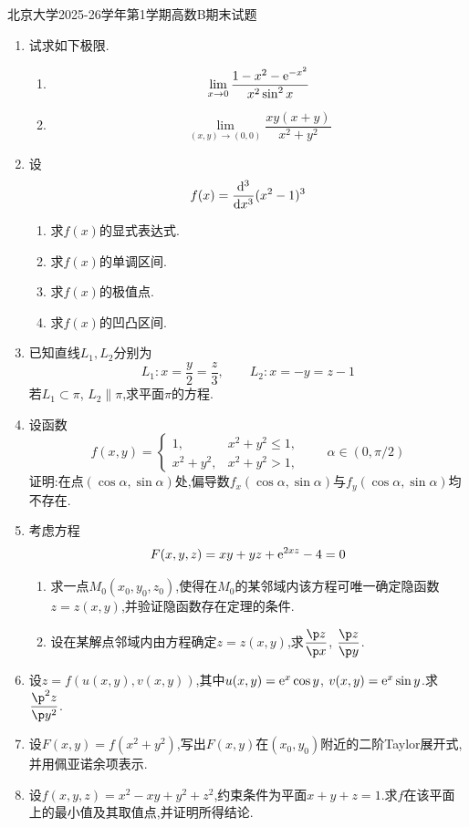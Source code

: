 \documentclass{ctexart}
\begin{document}
\pagestyle{empty}
\begin{center}\Large
北京大学2025-26学年第1学期高数B期末试题
\end{center}

\begin{enumerate}[leftmargin=*,label=\textbf{\arabic*.},topsep=0pt,parsep=0pt,itemsep=0pt,partopsep=0pt]
    \item 试求如下极限.
\begin{enumerate}[label=\tbf{(\alph*)},leftmargin=*,topsep=0pt,parsep=0pt,itemsep=0pt,partopsep=0pt]
\item \[\lim_{x\to0}\dfrac{1-x^2-\mathrm{e}^{-x^2}}{x^2\sin^2x}\]
\item \[\lim_{(x,y)\to(0,0)}\dfrac{xy(x+y)}{x^2+y^2}\]
\end{enumerate}
    \item 设
\[f(x)=\dfrac{\mathrm{d}^3}{\mathrm{d} x^3}(x^2-1)^3\]
\begin{enumerate}[label=\tbf{(\alph*)},leftmargin=*,topsep=0pt,parsep=0pt,itemsep=0pt,partopsep=0pt]
\item 求$f(x)$的显式表达式.
\item 求$f(x)$的单调区间.
\item 求$f(x)$的极值点.
\item 求$f(x)$的凹凸区间.
\end{enumerate}
    \item 已知直线$L_1,L_2$分别为
\[L_1:x=\dfrac y2=\dfrac z3,\qquad L_2:x=-y=z-1\]
若$L_1\subset\pi$, $L_2\parallel\pi$,求平面$\pi$的方程.
    \item 设函数
\[f(x,y)=\begin{cases}1,&x^2+y^2\leqslant1,\\x^2+y^2,&x^2+y^2>1,\end{cases}\qquad \alpha\in(0,\pi/2)\]
证明:在点$(\cos\alpha,\sin\alpha)$处,偏导数$f_x(\cos\alpha,\sin\alpha)$与$f_y(\cos\alpha,\sin\alpha)$均不存在.
    \item 考虑方程
\[F(x,y,z)=xy+yz+\mathrm{e}^{2xz}-4=0\]
\begin{enumerate}[label=\tbf{(\alph*)},leftmargin=*,topsep=0pt,parsep=0pt,itemsep=0pt,partopsep=0pt]
\item 求一点$M_0(x_0,y_0,z_0)$,使得在$M_0$的某邻域内该方程可唯一确定隐函数$z=z(x,y)$,并验证隐函数存在定理的条件.
\item 设在某解点邻域内由方程确定$z=z(x,y)$,求$\dfrac{\p z}{\p x}$, $\dfrac{\p z}{\p y}$.
\end{enumerate}
    \item 设$z=f(u(x,y),v(x,y))$,其中$u(x,y)=\mathrm{e}^x\cos y$, $v(x,y)=\mathrm{e}^x\sin y$.求$\dfrac{\p^2z}{\p y^2}$.
    \item 设$F(x,y)=f(x^2+y^2)$,写出$F(x,y)$在$(x_0,y_0)$附近的二阶Taylor展开式,并用佩亚诺余项表示.
    \item 设$f(x,y,z)=x^2-xy+y^2+z^2$,约束条件为平面$x+y+z=1$.求$f$在该平面上的最小值及其取值点,并证明所得结论.
\end{enumerate}
\end{document}
